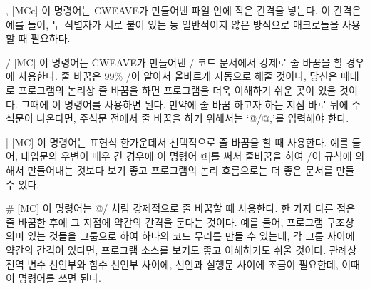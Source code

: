 \@, [MCc] 이 명령어는 \.{CWEAVE}가 만들어낸 파일 안에 작은 간격을 넣는다.
이 간격은 예를 들어, 두 식별자가 서로 붙어 있는 등 일반적이지 않은
방식으로 매크로들을 사용할 때 필요하다. 

\@/ [MC] 이 명령어는 \.{CWEAVE}가 만들어낸 \CEE/ 코드 문서에서 강제로
줄 바꿈을 할 경우에 사용한다. 줄 바꿈은 99\% \TEX/이 알아서 올바르게
자동으로 해줄 것이나, 당신은 때대로 프로그램의 논리상 줄 바꿈을 하면
프로그램을 더욱 이해하기 쉬운 곳이 있을 것이다. 그때에 이 명령어를
사용하면 된다. 만약에 줄 바꿈 하고자 하는 지점 바로 뒤에 주석문이
나온다면, 주석문 전에서 줄 바꿈을 하기 위해서는 `\.{@/@,}'를 입력해야 한다.

\@| [MC] 이 명령어는 표현식 한가운데서 선택적으로 줄 바꿈을 할 때
사용한다. 예를 들어, 대입문의 우변이 매우 긴 경우에 이 명령어 \.{@|}를
써서 줄바꿈을 하여 \TEX/이 규칙에 의해서 만들어내는 것보다 보기 좋고
프로그램의 논리 흐름으로는 더 좋은 문서를 만들 수 있다.

\@\# [MC] 이 명령어는 \.{@/} 처럼 강제적으로 줄 바꿈할 때
사용한다. 한 가지 다른 점은 줄 바꿈한 후에 그 지점에 약간의 간격을 둔다는
것이다. 예를 들어, 프로그램 구조상 의미 있는 것들을 그룹으로 하여
하나의 코드 무리를 만들 수 있는데, 각 그룹 사이에 약간의 간격이
있다면, 프로그램 소스를 보기도 좋고 이해하기도 쉬울 것이다. 관례상 전역
변수 선언부와 함수 선언부 사이에, 선언과 실행문 사이에 조금이
필요한데, 이때 이 명령어를 쓰면 된다.

